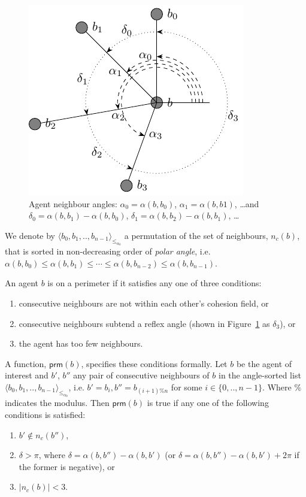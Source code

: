 \documentclass[12pt,a4paper]{IEEEtran}
\newcommand{\card}[1]{\vert{#1}\vert}
\newcommand{\pangle}{\mathit{\alpha}}
\newcommand{\leqaz}[3]{#2 \leq_{\pangle_#1} #3}
\newcommand{\angleordered}[2]{\langle #2 \rangle_{\leqaz{#1}{}{}}}
\newcommand{\prm}{\mathsf{prm}}
\begin{document}
\begin{figure}[H]
	\centering
	\includegraphics[width=0.8\linewidth]{figures/neighbours3}
	\caption[Agent neighbours]{Agent neighbour angles: {\small
	 $\alpha_0 = \pangle(b, b_0)$, $\alpha_1 = \pangle(b, b1)$, \ldots and
	 $\delta_0 = \pangle(b, b_1) - \pangle(b, b_0)$, $\delta_1 = \pangle(b, b_2) - \pangle(b, b_1)$, \ldots}}
	\label{fig:neighbours3}
\end{figure}

We denote by $\angleordered{b}{b_0, b_1, .., b_{n-1}}$ a permutation of the set of
neighbours, $n_c(b)$, that is sorted in non-decreasing order of \emph{polar angle}, i.e.
$\pangle(b, b_0) \leq \pangle(b, b_1) \leq \cdots \leq \pangle(b, b_{n-2}) \leq \pangle(b, b_{n-1})$.

An agent $b$ is on a perimeter if it satisfies any one of three conditions:
\begin{enumerate}
	\item consecutive neighbours are not within each other's cohesion field, or
	\item consecutive neighbours subtend a reflex angle (shown in Figure~\ref{fig:neighbours3} as $\delta_3$), or
	\item the agent has too few neighbours.
\end{enumerate}

A function, $\prm(b)$, specifies these conditions formally. Let $b$ be the agent of interest and $b'$, $b''$ any pair of consecutive neighbours of $b$ in the angle-sorted list $\angleordered{b}{b_0, b_1, .., b_{n-1}}$, i.e. $b' =
b_i, b'' = b_{(i+1)\%n}$ for some $i \in \{0,..,n-1\}$. Where $\%$ indicates the modulus. Then $\prm(b)$ is true if any one of the following conditions is satisfied:
\begin{enumerate}
\item $b' \notin n_c(b'')$,
\item $\delta > \pi$, where $\delta = \pangle(b, b'') - \pangle(b, b')$ (or $\delta = \pangle(b, b'') - \pangle(b, b') + 2\pi$ if the former is negative), or
\item $\card{n_c(b)} < 3$.
\end{enumerate}
\end{document}
